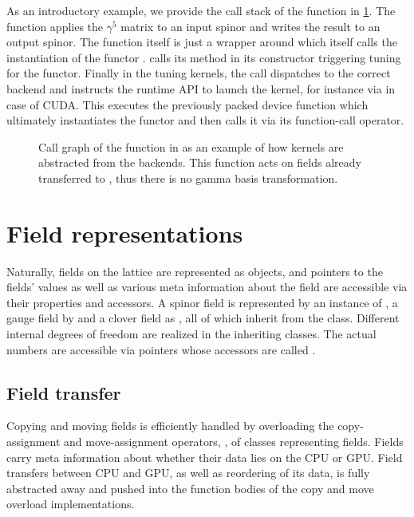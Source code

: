 As an introductory example, we provide the call stack of the function  in \cref{fig:quda:gamma5}.
The function applies the $\gamma^5$ matrix to an input spinor and writes the result to an output spinor.
The function itself is just a wrapper around  which itself calls the instantiation of the functor .
 calls its  method in its constructor triggering tuning for the  functor.
Finally in the tuning kernels, the  call dispatches to the correct backend and instructs the runtime API to launch the kernel, for instance via  in case of CUDA.
This executes the previously packed device function which ultimately instantiates the  functor and then calls it via its function-call operator.
\begin{figure}

\caption{
Call graph of the  function in \quda as an example of how kernels are abstracted from the backends.
This function acts on fields already transferred to \quda, thus there is no gamma basis transformation.
}
\label{fig:quda:gamma5}
\end{figure}

\section{Field representations}

Naturally, fields on the lattice are represented as objects, and pointers to the fields' values as well as various meta information about the field are accessible via their properties and accessors.
A spinor field is represented by an instance of , a gauge field by  and a clover field as , all of which inherit from the  class. Different internal degrees of freedom are realized in the inheriting classes. The actual numbers are accessible via pointers whose accessors are called .

\subsection{Field transfer}

Copying and moving fields is efficiently handled by overloading the copy-assignment and move-assignment operators, , of classes representing fields.
Fields carry meta information about whether their data lies on the CPU or GPU.
Field transfers between CPU and GPU, as well as reordering of its data, is fully abstracted away and pushed into the function bodies of the copy and move overload implementations.

